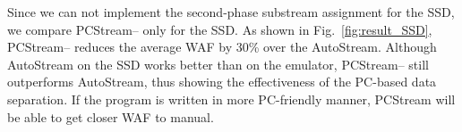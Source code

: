 Since we can not implement the second-phase substream assignment
for the SSD, we compare {\sf PCStream--} only for the SSD.
As shown in Fig.~\ref{fig:result_SSD}, 
{\sf PCStream--} reduces the average WAF by 30\%  over the AutoStream. 
Although AutoStream on the SSD works better than on the emulator,
{\sf PCStream--} still outperforms AutoStream,
thus showing the effectiveness of the PC-based 
data separation.
If the program is written in more PC-friendly manner, 
{\sf PCStream} will be able to get closer WAF to manual.

